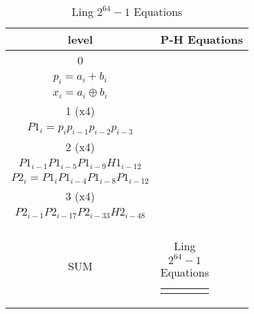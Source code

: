 \begin{table}[H]
\centering
     \begin{tabularx}{\textwidth}{ || c | X || } 

        \hline
        level & P-H Equations\\
        \hline
        \hline
        
        0   & 
        \begin{tabular}{@{}c@{}}
        $g_i = a_i * b_i$\\
        $p_i = a_i + b_i$\\
        $x_i = a_i \oplus b_i $
        \end{tabular}\\\hline

        
        1 (x4)  & 
        \begin{tabular}{@{}c@{}}
        $H1_i = g_i + g_{i-1} + p_{i-1}g_{i-2} + p_{i-1}p_{i-2}g_{i-3} $\\
        $P1_i = p_ip_{i-1}p_{i-2}p_{i-3}$
        \end{tabular}\\\hline

        2 (x4)  & 
        \begin{tabular}{@{}c@{}}
        $H2_i = H1_i + P1_{i-1}H1_{i-4} + P1_{i-1}P1_{i-5}H1_{i-8} +$ \\ $P1_{i-1}P1_{i-5}P1_{i-9}H1_{i-12}$\\
        $P2_i = P1_{i}P1_{i-4}P1_{i-8}P1_{i-12}$
        \end{tabular}\\\hline

        3 (x4)  & 
        \begin{tabular}{@{}c@{}}
        $H3_i = H2_i + P2_{i-1}H2_{i-16} + P2_{i-1}P2_{i-17}H2_{i-32} +$ \\ $P2_{i-1}P2_{i-17}P2_{i-33}H2_{i-48}$\\
        \end{tabular}\\\hline
        
        SUM   & 
        \begin{tabular}{@{}c@{}}
        $ sum_i = H2_{i-1}\ ?\ (x_i \oplus p_{i-1})\ :\ x_i$
        \end{tabular}\\\hline

    \end{tabularx}
\caption{Ling $2^{64}-1$ Equations}
\end{table}


